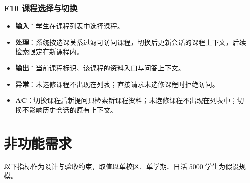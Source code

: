 \documentclass[12pt,a4paper]{ctexart}
\begin{document}
\subsubsection{F10 课程选择与切换}
\label{srs-f10}

\begin{itemize}
  \item \textbf{输入}：学生在课程列表中选择课程。
  \item \textbf{处理}：系统按选课关系过滤可访问课程，切换后更新会话的课程上下文，后续检索限定在新课程内。
  \item \textbf{输出}：当前课程标识、该课程的资料入口与问答上下文。
  \item \textbf{异常}：未选修课程不出现在列表；直接请求未选修课程时拒绝访问。
  \item \textbf{AC}：切换课程后新提问只检索新课程资料；未选修课程不出现在列表中；切换不影响历史会话的原有上下文。
\end{itemize}

\section{非功能需求}
\label{sec:nfr}

以下指标作为设计与验收约束，取值以单校区、单学期、日活 5000 学生为假设规模。
\end{document}
